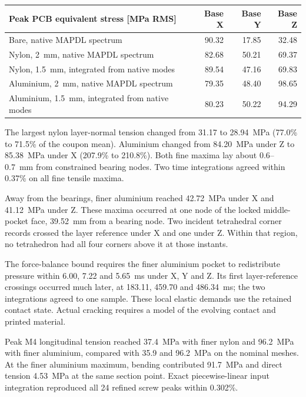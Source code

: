 \documentclass[10pt,a4paper]{article}
\newcommand{\heading}[1]{\par\vspace{4pt}{\large\bfseries\color{B}#1}\par}
\begin{document}
\begin{center}\small\begin{tabular}{lrrr}\toprule
Peak PCB equivalent stress [MPa RMS] & Base X & Base Y & Base Z\\\midrule
Bare, native MAPDL spectrum & 90.32 & 17.85 & 32.48\\
Nylon, 2~mm, native MAPDL spectrum & 82.68 & 50.21 & 69.37\\
Nylon, 1.5~mm, integrated from native modes & 89.54 & 47.16 & 69.83\\
Aluminium, 2~mm, native MAPDL spectrum & 79.35 & 48.40 & 98.65\\
Aluminium, 1.5~mm, integrated from native modes & 80.23 & 50.22 & 94.29\\\bottomrule
\end{tabular}\end{center}

\heading{Printed tab and middle-pocket contact}
The largest nylon layer-normal tension changed from 31.17 to 28.94~MPa (77.0\% to 71.5\% of the coupon mean). Aluminium changed from 84.20~MPa under Z to 85.38~MPa under X (207.9\% to 210.8\%). Both fine maxima lay about 0.6--0.7~mm from constrained bearing nodes. Two time integrations agreed within 0.37\% on all fine tensile maxima.

Away from the bearings, finer aluminium reached 42.72~MPa under X and 41.12~MPa under Z. These maxima occurred at one node of the locked middle-pocket face, 39.52~mm from a bearing node. Two incident tetrahedral corner records crossed the layer reference under X and one under Z. Within that region, no tetrahedron had all four corners above it at those instants.

The force-balance bound requires the finer aluminium pocket to redistribute pressure within 6.00, 7.22 and 5.65~ms under X, Y and Z. Its first layer-reference crossings occurred much later, at 183.11, 459.70 and 486.34~ms; the two integrations agreed to one sample. These local elastic demands use the retained contact state. Actual cracking requires a model of the evolving contact and printed material.

Peak M4 longitudinal tension reached 37.4~MPa with finer nylon and 96.2~MPa with finer aluminium, compared with 35.9 and 96.2~MPa on the nominal meshes. At the finer aluminium maximum, bending contributed 91.7~MPa and direct tension 4.53~MPa at the same section point. Exact piecewise-linear input integration reproduced all 24 refined screw peaks within 0.302\%.
\end{document}
